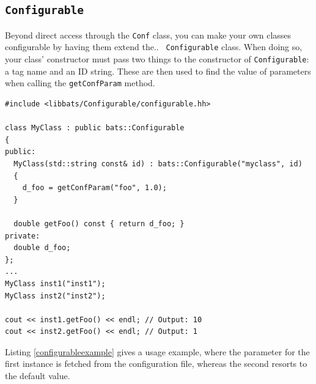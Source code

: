 \subsection{{\tt Configurable}}
\label{sec:tt-configurable}

Beyond direct access through the {\tt Conf} class, you can make your
own classes configurable by having them extend the.. {\tt
  Configurable} class. When doing so, your class' constructor must
pass two things to the constructor of {\tt Configurable}: a tag name
and an ID string. These are then used to find the value of parameters
when calling the {\tt getConfParam} method. 

\begin{lstlisting}[float,caption={\tt Configurable} example,label=configurableexample,frame=single]
#include <libbats/Configurable/configurable.hh>

class MyClass : public bats::Configurable
{
public:
  MyClass(std::string const& id) : bats::Configurable("myclass", id)
  {
    d_foo = getConfParam("foo", 1.0);
  }

  double getFoo() const { return d_foo; }
private:
  double d_foo;
};
...
MyClass inst1("inst1");
MyClass inst2("inst2");

cout << inst1.getFoo() << endl; // Output: 10
cout << inst2.getFoo() << endl; // Output: 1
\end{lstlisting}

Listing \ref{configurableexample} gives a usage example, where the
parameter for the first instance is fetched from the configuration
file, whereas the second resorts to the default value.

